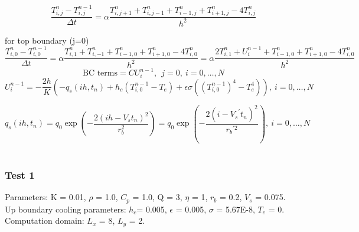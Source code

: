 \documentclass[a4paper,12pt]{article}
\begin{document}
\begin{equation}
\frac{T_{i,j}^n - T_{i,j}^{n-1}}{\Delta t} = \alpha \frac{T_{i,j+1}^n + T_{i,j-1}^n + T_{i-1,j}^n + T_{i+1,j}^n - 4 T_{i,j}^n }{h^2} 
\end{equation}

for top boundary (j=0)
\begin{equation}
\frac{T_{i,0}^n - T_{i,0}^{n-1}}{\Delta t} = \alpha \frac{T_{i,1}^n + T_{i,-1}^n + T_{i-1,0}^n + T_{i+1,0}^n - 4 T_{i,0}^n }{h^2} =\alpha \frac{2T_{i,1}^n + U_i^{n-1}+ T_{i-1,0}^n + T_{i+1,0}^n - 4 T_{i,0}^n }{h^2} 
\end{equation}
\begin{equation}
 \text{BC terms}=CU_i^{n-1},\ \  j=0,  \ i = 0 , \dots , N
\end{equation}
\begin{equation}
U_i^{n-1}=-\frac{2h}{K}\left(-q_s (ih, t_n) + h_c (T^{n-1}_{i,0} - T_e) + \epsilon \sigma ( (T^{n-1}_{i,0})^4 - T_e^4)\right), \ i = 0 , \dots , N
\end{equation}

\begin{equation}
q_s (ih, t_n) =q_0\exp \left( -\frac{ 2(ih-V_s t_n)^2}{ r_b^2} \right)= q_0\exp \left( -\frac{ 2(i-{V_s}^{'} t_n)^2}{{ r_b}^{'2}} \right) , \ i = 0 , \dots , N
\end{equation}
\\
\subsubsection{Test 1}
Parameters: K = 0.01, $\rho$ = 1.0, $C_p$ = 1.0, Q = 3, $\eta$ = 1, $r_b$ = 0.2, $V_s$ = 0.075. \\
Up boundary cooling parameters: $h_c$= 0.005, $\epsilon$ = 0.005, $\sigma$ = 5.67E-8, $T_e$ = 0.\\
Computation domain: $L_x$ = 8, $L_y$ = 2.
\end{document}
